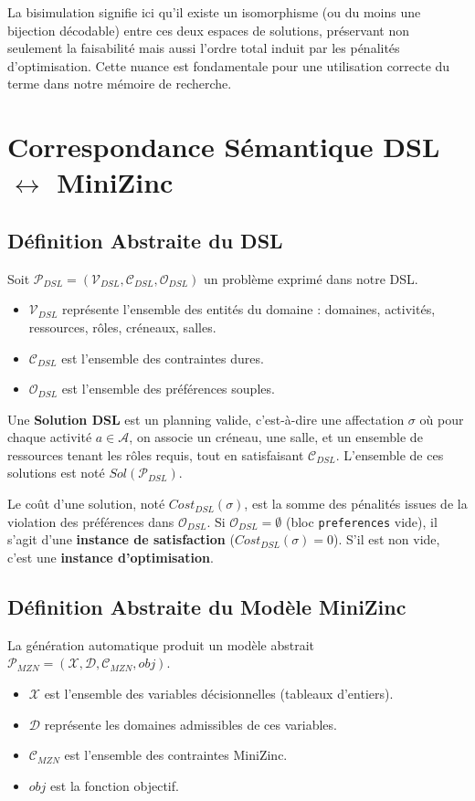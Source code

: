 \documentclass[12pt,a4paper]{article}
\begin{document}
La bisimulation signifie ici qu'il existe un isomorphisme (ou du moins une bijection décodable) entre ces deux espaces de solutions, préservant non seulement la faisabilité mais aussi l'ordre total induit par les pénalités d'optimisation. Cette nuance est fondamentale pour une utilisation correcte du terme dans notre mémoire de recherche.

\section{Correspondance Sémantique DSL $\leftrightarrow$ MiniZinc}

\subsection{Définition Abstraite du DSL}
Soit $\mathcal{P}_{DSL} = (\mathcal{V}_{DSL}, \mathcal{C}_{DSL}, \mathcal{O}_{DSL})$ un problème exprimé dans notre DSL.
\begin{itemize}
    \item $\mathcal{V}_{DSL}$ représente l'ensemble des entités du domaine : domaines, activités, ressources, rôles, créneaux, salles.
    \item $\mathcal{C}_{DSL}$ est l'ensemble des contraintes dures.
    \item $\mathcal{O}_{DSL}$ est l'ensemble des préférences souples.
\end{itemize}

Une \textbf{Solution DSL} est un planning valide, c'est-à-dire une affectation $\sigma$ où pour chaque activité $a \in \mathcal{A}$, on associe un créneau, une salle, et un ensemble de ressources tenant les rôles requis, tout en satisfaisant $\mathcal{C}_{DSL}$. L'ensemble de ces solutions est noté $Sol(\mathcal{P}_{DSL})$.

Le coût d'une solution, noté $Cost_{DSL}(\sigma)$, est la somme des pénalités issues de la violation des préférences dans $\mathcal{O}_{DSL}$. Si $\mathcal{O}_{DSL} = \emptyset$ (bloc \texttt{preferences} vide), il s'agit d'une \textbf{instance de satisfaction} ($Cost_{DSL}(\sigma) = 0$). S'il est non vide, c'est une \textbf{instance d'optimisation}.

\subsection{Définition Abstraite du Modèle MiniZinc}
La génération automatique produit un modèle abstrait $\mathcal{P}_{MZN} = (\mathcal{X}, \mathcal{D}, \mathcal{C}_{MZN}, obj)$.
\begin{itemize}
    \item $\mathcal{X}$ est l'ensemble des variables décisionnelles (tableaux d'entiers).
    \item $\mathcal{D}$ représente les domaines admissibles de ces variables.
    \item $\mathcal{C}_{MZN}$ est l'ensemble des contraintes MiniZinc.
    \item $obj$ est la fonction objectif.
\end{itemize}
\end{document}
